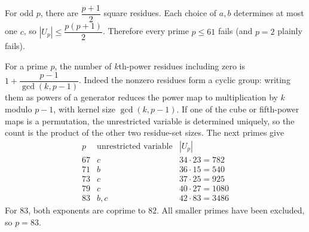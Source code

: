 For odd $p$, there are $\dfrac{p+1}{2}$ square residues. Each choice of $a,b$ determines at most one $c$, so $|U_p|\le\dfrac{p(p+1)}{2}$. Therefore every prime $p\le61$ fails (and $p=2$ plainly fails).

For a prime $p$, the number of $k$th-power residues including zero is $1+\dfrac{p-1}{\gcd(k,p-1)}$. Indeed the nonzero residues form a cyclic group: writing them as powers of a generator reduces the power map to multiplication by $k$ modulo $p-1$, with kernel size $\gcd(k,p-1)$.
If one of the cube or fifth-power maps is a permutation, the unrestricted variable is determined uniquely, so the count is the product of the other two residue-set sizes.
The next primes give
\[
\begin{array}{c|c|c}
p&\text{unrestricted variable}&|U_p|\\\hline
67&c&34\cdot23=782\\
71&b&36\cdot15=540\\
73&c&37\cdot25=925\\
79&c&40\cdot27=1080\\
83&b,c&42\cdot83=3486
\end{array}
\]
For $83$, both exponents are coprime to $82$. All smaller primes have been excluded, so $\boxed{p=83}$.
